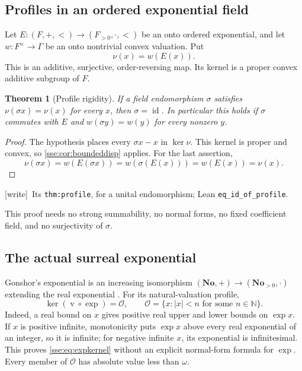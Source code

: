 \documentclass[11pt,a4paper]{article}
\numberwithin{equation}{section}
\theoremstyle{plain}
\newtheorem{theorem}{Theorem}[section]
\theoremstyle{definition}
\theoremstyle{remark}
\newcommand{\No}{\mathbf{No}}
\newcommand{\N}{\mathbb{N}}
\newcommand{\id}{\operatorname{id}}
\newcommand{\val}{\operatorname{v}}
\newcommand{\code}[1]{\texttt{\small #1}}
\newcommand{\lbl}[1]{\nolinkurl{#1}}%
\newcommand{\wtag}{\textup{\textsf{[write]}}}%
\newenvironment{wnote}{\par\smallskip\noindent\wtag\ }{\par\smallskip}
\begin{document}
\subsection{Profiles in an ordered exponential field}
Let $E:(F,+,<)\to(F_{>0},\cdot,<)$ be an onto ordered exponential, and let
$w:F^\times\to\Gamma$ be an onto nontrivial convex valuation. Put
\[
 \nu(x)=w(E(x)).
\]
This is an additive, surjective, order-reversing map. Its kernel is a
proper convex additive subgroup of $F$.

\begin{theorem}[Profile rigidity]\label{sse:thm:profile}
If a field endomorphism $\sigma$ satisfies $\nu(\sigma x)=\nu(x)$ for
every $x$, then $\sigma=\id$. In particular this holds if $\sigma$
commutes with $E$ and $w(\sigma y)=w(y)$ for every nonzero $y$.
\end{theorem}
\begin{proof}
The hypothesis places every $\sigma x-x$ in $\ker\nu$. This kernel is
proper and convex, so \cref{sse:cor:boundeddisp} applies. For the last
assertion,
\[
 \nu(\sigma x)=w(E(\sigma x))=w(\sigma(E(x)))=w(E(x))=\nu(x).
\]
\end{proof}
\begin{wnote}Its \lbl{thm:profile}, for a unital endomorphism; Lean \code{eq\_id\_of\_profile}.\end{wnote}
This proof needs no strong summability, no normal forms, no fixed
coefficient field, and no surjectivity of $\sigma$.

\subsection{The actual surreal exponential}
Gonshor's exponential is an increasing isomorphism
$(\No,+)\to(\No_{>0},\cdot)$ extending the real exponential
\cite{Gonshor,vdDE,BM}. For its natural-valuation profile,
\begin{equation}\label{sse:eq:expkernel}
 \ker(\val\circ\exp)=\mathcal O,
 \qquad
 \mathcal O=\{x: |x|<n\text{ for some }n\in\N\}.
\end{equation}
Indeed, a real bound on $x$ gives positive real upper and lower bounds on
$\exp x$. If $x$ is positive infinite, monotonicity puts $\exp x$ above
every real exponential of an integer, so it is infinite; for negative
infinite $x$, its exponential is infinitesimal. This proves
\eqref{sse:eq:expkernel} without an explicit normal-form formula for $\exp$.
Every member of $\mathcal O$ has absolute value less than $\omega$.
\end{document}
